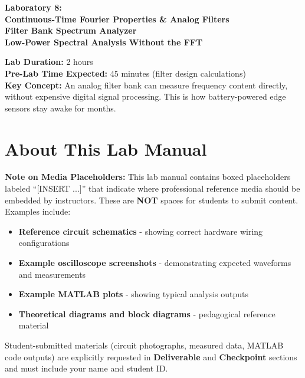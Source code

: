 \documentclass[11pt,letterpaper]{article}
\begin{document}
\begin{center}
\huge{\bf Laboratory 8:}\\
\vspace{0.2in}
\Large{\bf Continuous-Time Fourier Properties \& Analog Filters}\\
\Large{\bf Filter Bank Spectrum Analyzer}\\
\vspace{0.2in}
\normalsize{\bf Low-Power Spectral Analysis Without the FFT}
\end{center}

\vspace{0.3in}
\noindent
\textbf{Lab Duration:} 2 hours\\
\textbf{Pre-Lab Time Expected:} 45 minutes (filter design calculations)\\
\textbf{Key Concept:} An analog filter bank can measure frequency content directly, without expensive digital signal processing. This is how battery-powered edge sensors stay awake for months.

\tableofcontents
\clearpage

\section*{About This Lab Manual}

\textbf{Note on Media Placeholders:} This lab manual contains boxed placeholders labeled ``[INSERT ...]'' that indicate where professional reference media should be embedded by instructors. These are \textbf{NOT} spaces for students to submit content. Examples include:

\begin{itemize}
    \item \textbf{Reference circuit schematics} - showing correct hardware wiring configurations
    \item \textbf{Example oscilloscope screenshots} - demonstrating expected waveforms and measurements
    \item \textbf{Example MATLAB plots} - showing typical analysis outputs
    \item \textbf{Theoretical diagrams and block diagrams} - pedagogical reference material
\end{itemize}

\noindent Student-submitted materials (circuit photographs, measured data, MATLAB code outputs) are explicitly requested in \textbf{Deliverable} and \textbf{Checkpoint} sections and must include your name and student ID.
\end{document}

